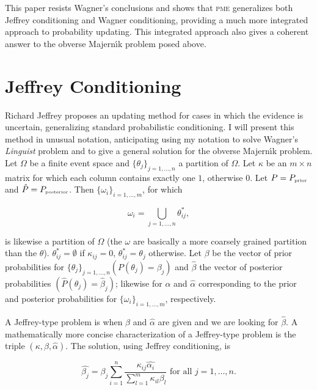 \documentclass[entropy,article,accept,oneauthor,pdftex,12pt,a4paper]{mdpi}
\begin{document}
This paper resists Wagner's conclusions and shows that \textsc{pme}
generalizes both Jeffrey conditioning and Wagner conditioning,
providing a much more integrated approach to probability updating.
This integrated approach also gives a coherent answer to the obverse
Majern{\'\i}k problem posed above.

\section{Jeffrey Conditioning}
\label{jc}

Richard Jeffrey proposes an updating method for cases in which the
evidence is uncertain, generalizing standard probabilistic
conditioning. I will present this method in unusual notation,
anticipating using my notation to solve Wagner's \emph{Linguist}
problem and to give a general solution for the obverse Majern{\'\i}k
problem. Let $\Omega$ be a finite event space and
$\{\theta_{j}\}_{j=1,\ldots,n}$ a partition of $\Omega$. Let $\kappa$
be an $m\times{}n$ matrix for which each column contains exactly one
$1$, otherwise $0$. Let $P=P_{\mbox{\tiny{prior}}}$ and
$\hat{P}=P_{\mbox{\tiny{posterior}}}$. Then
$\{\omega_{i}\}_{i=1,\ldots,m}$, for which

\begin{equation}
  \label{eq:m1}
  \omega_{i}=\bigcup_{j=1,\dots,n}\theta^{*}_{ij},
\end{equation}

{\noindent}is likewise a partition of $\Omega$ (the $\omega$ are
basically a more coarsely grained partition than the $\theta$).
$\theta^{*}_{ij}=\emptyset$ if $\kappa_{ij}=0$,
$\theta^{*}_{ij}=\theta_{j}$ otherwise. Let $\beta$ be the vector of
prior probabilities for $\{\theta_{j}\}_{j=1,\ldots,n}
(P(\theta_{j})=\beta_{j})$ and $\hat{\beta}$ the vector of posterior
probabilities $(\hat{P}(\theta_{j})=\hat{\beta}_{j})$; likewise for
$\alpha$ and $\hat{\alpha}$ corresponding to the prior and posterior
probabilities for $\{\omega_{i}\}_{i=1,\ldots,m}$, respectively.

A Jeffrey-type problem is when $\beta$ and $\hat{\alpha}$ are given
and we are looking for $\hat{\beta}$. A mathematically more concise
characterization of a Jeffrey-type problem is the triple
$(\kappa,\beta,\hat{\alpha})$. The solution, using Jeffrey
conditioning, is

\begin{equation}
  \label{eq:m2}
  \hat{\beta_{j}}=\beta_{j}\sum_{i=1}^{n}\frac{\kappa_{ij}\hat{\alpha_{i}}}{\sum_{l=1}^{m}\kappa_{il}\beta_{l}}\mbox{ for all }j=1,\ldots,n.
\end{equation}
\end{document}
